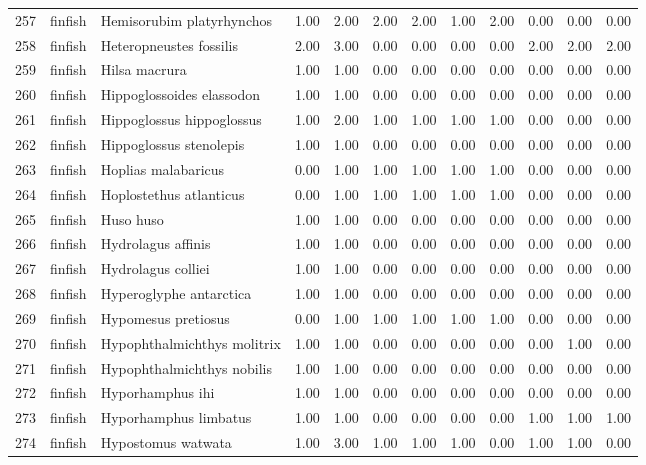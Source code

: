 \begin{table}[ht]
\begin{tabular}{rllrrrrrrrrr}
  257 & finfish & Hemisorubim platyrhynchos & 1.00 & 2.00 & 2.00 & 2.00 & 1.00 & 2.00 & 0.00 & 0.00 & 0.00 \\ 
  258 & finfish & Heteropneustes fossilis & 2.00 & 3.00 & 0.00 & 0.00 & 0.00 & 0.00 & 2.00 & 2.00 & 2.00 \\ 
  259 & finfish & Hilsa macrura & 1.00 & 1.00 & 0.00 & 0.00 & 0.00 & 0.00 & 0.00 & 0.00 & 0.00 \\ 
  260 & finfish & Hippoglossoides elassodon & 1.00 & 1.00 & 0.00 & 0.00 & 0.00 & 0.00 & 0.00 & 0.00 & 0.00 \\ 
  261 & finfish & Hippoglossus hippoglossus & 1.00 & 2.00 & 1.00 & 1.00 & 1.00 & 1.00 & 0.00 & 0.00 & 0.00 \\ 
  262 & finfish & Hippoglossus stenolepis & 1.00 & 1.00 & 0.00 & 0.00 & 0.00 & 0.00 & 0.00 & 0.00 & 0.00 \\ 
  263 & finfish & Hoplias malabaricus & 0.00 & 1.00 & 1.00 & 1.00 & 1.00 & 1.00 & 0.00 & 0.00 & 0.00 \\ 
  264 & finfish & Hoplostethus atlanticus & 0.00 & 1.00 & 1.00 & 1.00 & 1.00 & 1.00 & 0.00 & 0.00 & 0.00 \\ 
  265 & finfish & Huso huso & 1.00 & 1.00 & 0.00 & 0.00 & 0.00 & 0.00 & 0.00 & 0.00 & 0.00 \\ 
  266 & finfish & Hydrolagus affinis & 1.00 & 1.00 & 0.00 & 0.00 & 0.00 & 0.00 & 0.00 & 0.00 & 0.00 \\ 
  267 & finfish & Hydrolagus colliei & 1.00 & 1.00 & 0.00 & 0.00 & 0.00 & 0.00 & 0.00 & 0.00 & 0.00 \\ 
  268 & finfish & Hyperoglyphe antarctica & 1.00 & 1.00 & 0.00 & 0.00 & 0.00 & 0.00 & 0.00 & 0.00 & 0.00 \\ 
  269 & finfish & Hypomesus pretiosus & 0.00 & 1.00 & 1.00 & 1.00 & 1.00 & 1.00 & 0.00 & 0.00 & 0.00 \\ 
  270 & finfish & Hypophthalmichthys molitrix & 1.00 & 1.00 & 0.00 & 0.00 & 0.00 & 0.00 & 0.00 & 1.00 & 0.00 \\ 
  271 & finfish & Hypophthalmichthys nobilis & 1.00 & 1.00 & 0.00 & 0.00 & 0.00 & 0.00 & 0.00 & 0.00 & 0.00 \\ 
  272 & finfish & Hyporhamphus ihi & 1.00 & 1.00 & 0.00 & 0.00 & 0.00 & 0.00 & 0.00 & 0.00 & 0.00 \\ 
  273 & finfish & Hyporhamphus limbatus & 1.00 & 1.00 & 0.00 & 0.00 & 0.00 & 0.00 & 1.00 & 1.00 & 1.00 \\ 
  274 & finfish & Hypostomus watwata & 1.00 & 3.00 & 1.00 & 1.00 & 1.00 & 0.00 & 1.00 & 1.00 & 0.00 \\ 

\end{tabular}
\end{table}

